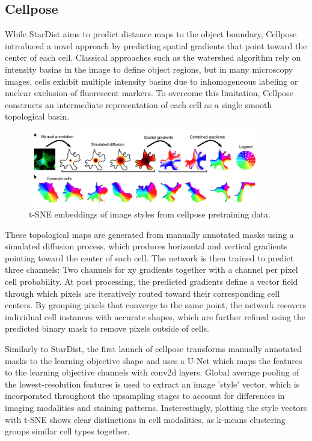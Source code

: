 \subsection{Cellpose}

While StarDist aims to predict distance maps to the object boundary, Cellpose introduced a novel approach by predicting spatial gradients that point toward the center of each cell. Classical approaches such as the watershed algorithm rely on intensity basins in the image to define object regions, but in many microscopy images, cells exhibit multiple intensity basins due to inhomogeneous labeling or nuclear exclusion of fluorescent markers. To overcome this limitation, Cellpose constructs an intermediate representation of each cell as a single smooth topological basin.

\begin{figure}[!ht]
    \centering
    \includegraphics[width=0.9\textwidth]{Images/SOTA/cellpose_learning_objective.png}
    \caption{t-SNE embeddings of image styles from cellpose pretraining data.}
    \label{fig:cellpose_learning_objective}
\end{figure}

These topological maps are generated from manually annotated masks using a simulated diffusion process, which produces horizontal and vertical gradients pointing toward the center of each cell. The network is then trained to predict three channels: Two channels for xy gradients together with a channel per pixel cell probability. At post processing, the predicted gradients define a vector field through which pixels are iteratively routed toward their corresponding cell centers. By grouping pixels that converge to the same point, the network recovers individual cell instances with accurate shapes, which are further refined using the predicted binary mask to remove pixels outside of cells.

Similarly to StarDist, the first launch of cellpose transforms manually annotated masks to the learning objective shape and uses a U-Net which maps the features to the learning objective channels with conv2d layers. Global average pooling of the lowest-resolution features is used to extract an image 'style' vector, which is incorporated throughout the upsampling stages to account for differences in imaging modalities and staining patterns. Insterestingly, plotting the style vectors with t-SNE shows clear distinctions in cell modalities, as k-means clustering groups similar cell types together.

